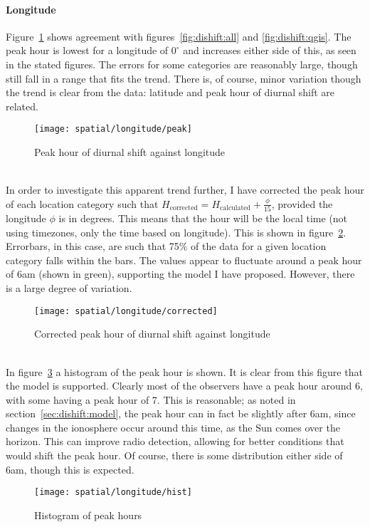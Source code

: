 \paragraph{Longitude\\}
Figure~\ref{fig:dishift:lon:peak} shows agreement with figures~\ref{fig:dishift:all} and \ref{fig:dishift:qgis}. The peak hour is lowest for a longitude of $0^{\circ}$ and increases either side of this, as seen in the stated figures. The errors for some categories are reasonably large, though still fall in a range that fits the trend. There is, of course, minor variation though the trend is clear from the data: latitude and peak hour of diurnal shift are related.
\begin{figure}[h!]
	\centering
	\texttt{[image: spatial/longitude/peak]}
	\caption{Peak hour of diurnal shift against longitude
		\label{fig:dishift:lon:peak}}
\end{figure}\\
In order to investigate this apparent trend further, I have corrected the peak hour of each location category such that $H_{\text{corrected}} = H_{\text{calculated}} + \frac{\phi}{15}$, provided the longitude $\phi$ is in degrees. This means that the hour will be the local time (not using timezones, only the time based on longitude). This is shown in figure~\ref{fig:dishift:lon:corrected}. Errorbars, in this case, are such that 75\% of the data for a given location category falls within the bars. The values appear to fluctuate around a peak hour of 6am (shown in green), supporting the model I have proposed. However, there is a large degree of variation.
\begin{figure}[h!]
	\centering
	\texttt{[image: spatial/longitude/corrected]}
	\caption{Corrected peak hour of diurnal shift against longitude
		\label{fig:dishift:lon:corrected}}
\end{figure}\\
In figure~\ref{fig:dishift:lon:hist} a histogram of the peak hour is shown. It is clear from this figure that the model is supported. Clearly most of the observers have a peak hour around 6, with some having a peak hour of 7. This is reasonable; as noted in section~\ref{sec:dishift:model}, the peak hour can in fact be slightly after 6am, since changes in the ionosphere occur around this time, as the Sun comes over the horizon. This can improve radio detection, allowing for better conditions that would shift the peak hour. Of course, there is some distribution either side of 6am, though this is expected.
\begin{figure}[h!]
	\centering
	\texttt{[image: spatial/longitude/hist]}
	\caption{Histogram of peak hours
		\label{fig:dishift:lon:hist}}
\end{figure}


